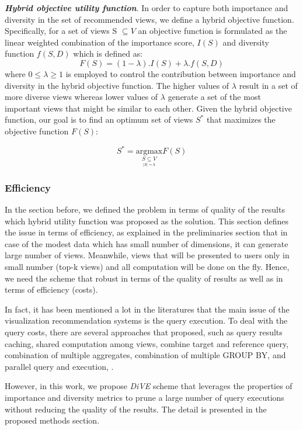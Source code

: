 {\textbf{\textit{Hybrid objective utility function}}. In order to capture both importance and diversity in the set of recommended views, we define a hybrid objective function. Specifically, for a set of views S $\subseteq V$ an objective function is formulated as the linear weighted combination of the importance score, $ I\left(S\right) $ and diversity function $ f\left(S,D\right) $ which is defined as:
\newline
\begin{equation}
	F\left(S\right) =  \left(1-\lambda\right).I\left(S\right) + \lambda.f\left(S,D\right)
	\label{objectif_function}
\end{equation}
\newline
where $ 0 \leq \lambda \geq 1 $ is employed to control the contribution between importance and diversity in the hybrid objective function. The higher values of $  \lambda $ result in a set of more diverse views whereas lower values of $ \lambda $ generate a set of the most important views that might be similar to each other. 
Given the hybrid objective function, our goal is to find an optimum set of views  $ S^* $ that maximizes the objective function $ F\left(S\right) $: 

\begin{equation}
	S^* = \underset{\underset{|S|=k} {S \subseteq V}} {\mathrm{argmax}} F\left(S\right) 
	\label{argmaxF}
\end{equation}



\subsubsection{Efficiency}
In the section before, we defined the problem in terms of quality of the results which hybrid utility function was proposed as the solution. This section defines the issue in terms of efficiency, as explained in the preliminaries section that in case of the modest data which has small number of dimensions, it can generate large number of views. Meanwhile, views that will be presented to users only in small number (top-k views) and all computation will be done on the fly. Hence, we need the scheme that robust in terms of the quality of results as well as in terms of efficiency (costs).

In fact, it has been mentioned a lot in the literatures \cite{Vartak2014, Vartak2015, Ehsan2016} that the main issue of the visualization recommendation systems is the query execution. To deal with the query costs, there are several approaches that proposed, such as query results caching, shared computation among views, combine target and reference query, combination of multiple aggregates, combination of multiple GROUP BY, and parallel query and execution, \cite{Vartak2015, Wu2014}. 

However, in this work, we propose \textit{DiVE} scheme that leverages the properties of importance and diversity metrics to prune a large number of query executions without reducing the quality of the results. The detail is presented in the proposed methods section. 

}






